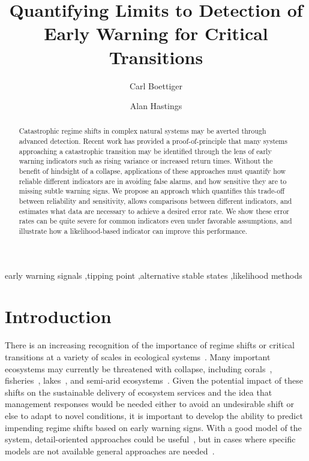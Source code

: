 \documentclass[authoryear,preprint,11pt]{elsarticle}
\begin{document}
\begin{frontmatter}
  \title{Quantifying Limits to Detection of Early Warning for Critical Transitions}
  \author[cpb]{Carl Boettiger}
  \author[esp]{Alan Hastings}
  \address[cpb]{Center for Population Biology, 1 Shields Avenue, University of California, Davis, CA, 95616 United States.}
  \address[esp]{Department of Environmental Science and Policy, University of California, Davis} 


  \begin{abstract}

Catastrophic regime shifts in complex natural systems may be averted through advanced detection. 
Recent work has provided a proof-of-principle that many systems approaching a catastrophic transition may be identified 
through the lens of early warning indicators such as rising variance or increased return times.  
Without the benefit of hindsight of a collapse, 
applications of these approaches must quantify how reliable different indicators are in avoiding false alarms, 
and how sensitive they are to missing subtle warning signs.  
We propose an approach which quantifies this trade-off between reliability and sensitivity, 
allows comparisons between different indicators, 
and estimates what data are necessary to achieve a desired error rate. 
We show these error rates can be quite severe for common indicators even under favorable assumptions, 
and illustrate how a likelihood-based indicator can improve this performance.  

  \end{abstract}

  \begin{keyword}
early warning signals \sep tipping point \sep alternative stable states \sep likelihood methods 
   \end{keyword}
 \end{frontmatter}

\section{Introduction}
There is an increasing recognition of the importance of regime shifts or critical transitions at a variety of scales in ecological systems~\citep{Holling1973, Wissel1984, Scheffer2001, Scheffer2009, Drake2010, Carpenter2011}⁠. 
Many important ecosystems may currently be threatened with collapse, including corals~\citep{Bellwood2004}, fisheries~\citep{Berkes2006}⁠, lakes~\citep{Carpenter2011}, and semi-arid ecosystems~\citep{Kefi2007}⁠. 
Given the potential impact of  these shifts on the sustainable delivery of ecosystem services
and the idea that management responses would be needed either to avoid an undesirable shift or else to adapt to novel conditions,
it is important to develop the ability to predict impending regime shifts based on early warning signs. 
With a good model of the system, detail-oriented approaches could be useful~\citep{Lenton2009},
but in cases where specific models are not available general approaches are needed~\citep{Scheffer2009}⁠.
\end{document}
